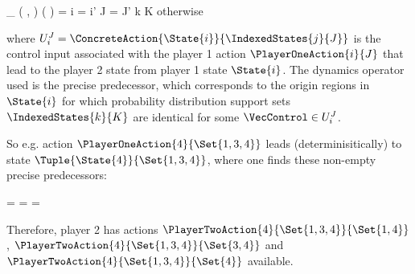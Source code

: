     \startformula
        \Transition_\GameGraph
            \Big( ,  \Big)
            \Big(  \Big)
        = \startmathcases
            \NC \displaystyle{}
            \MC \startgathered
                    \NC \StartIf i = i' \MidAnd J = J' \MidAnd k \in K
                    \NR
                    \NC \quad \MidAnd {} \neq \emptyset
                    \NR
                \stopgathered
            \NR
            \NC otherwise \EndComma
            \NR
        \stopmathcases
    \stopformula

    where $U_i^J = \ConcreteAction{\State{i}}{\IndexedStates{j}{J}}$ is the control input associated with the player 1 action $\PlayerOneAction{i}{J}$ that lead to the player 2 state from player 1 state $\State{i}$.
    The dynamics operator used is the precise predecessor, which corresponds to the origin regions in $\State{i}$ for which probability distribution support sets $\IndexedStates{k}{K}$ are identical for some $\VecControl \in U_i^J$.

    So e.g. action $\PlayerOneAction{4}{\Set{1, 3, 4}}$ leads (determinisitically) to state $\Tuple{\State{4}}{\Set{1, 3, 4}}$, where one finds these non-empty precise predecessors:

    \startformula
        \startalign[n=2,align={left,left}]
            \NC {}
            \NC = 
            \NR
            \NC {}
            \NC = 
            \NR
            \NC {}
            \NC = 
            \NR
        \stopalign
    \stopformula

    Therefore, player 2 has actions $\PlayerTwoAction{4}{\Set{1, 3, 4}}{\Set{1, 4}}$, $\PlayerTwoAction{4}{\Set{1, 3, 4}}{\Set{3, 4}}$ and $\PlayerTwoAction{4}{\Set{1, 3, 4}}{\Set{4}}$ available.

\stopsubsection


